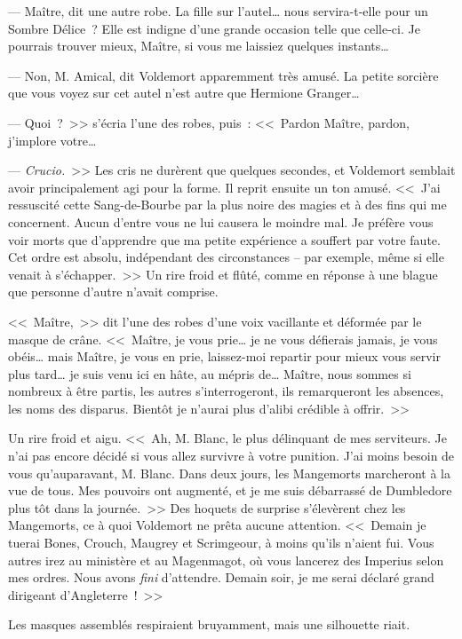 --- Maître, dit une autre robe. La fille sur l'autel… nous servira-t-elle pour un Sombre Délice~? Elle est indigne d'une grande occasion telle que celle-ci. Je pourrais trouver mieux, Maître, si vous me laissiez quelques instants…

--- Non, M. Amical, dit Voldemort apparemment très amusé. La petite sorcière que vous voyez sur cet autel n'est autre que Hermione Granger…

--- Quoi~?~>> s'écria l'une des robes, puis~: <<~Pardon Maître, pardon, j'implore votre…

--- \emph{Crucio.}~>> Les cris ne durèrent que quelques secondes, et Voldemort semblait avoir principalement agi pour la forme. Il reprit ensuite un ton amusé. <<~J'ai ressuscité cette Sang-de-Bourbe par la plus noire des magies et à des fins qui me concernent. Aucun d'entre vous ne lui causera le moindre mal. Je préfère vous voir morts que d'apprendre que ma petite expérience a souffert par votre faute. Cet ordre est absolu, indépendant des circonstances -- par exemple, même si elle venait à s'échapper.~>> Un rire froid et flûté, comme en réponse à une blague que personne d'autre n'avait comprise.

<<~Maître,~>> dit l'une des robes d'une voix vacillante et déformée par le masque de crâne. <<~Maître, je vous prie… je ne vous défierais jamais, je vous obéis… mais Maître, je vous en prie, laissez-moi repartir pour mieux vous servir plus tard… je suis venu ici en hâte, au mépris de… Maître, nous sommes si nombreux à être partis, les autres s'interrogeront, ils remarqueront les absences, les noms des disparus. Bientôt je n'aurai plus d'alibi crédible à offrir.~>>

Un rire froid et aigu. <<~Ah, M. Blanc, le plus délinquant de mes serviteurs. Je n'ai pas encore décidé si vous allez survivre à votre punition. J'ai moins besoin de vous qu'auparavant, M. Blanc. Dans deux jours, les Mangemorts marcheront à la vue de tous. Mes pouvoirs ont augmenté, et je me suis débarrassé de Dumbledore plus tôt dans la journée.~>> Des hoquets de surprise s'élevèrent chez les Mangemorts, ce à quoi Voldemort ne prêta aucune attention. <<~Demain je tuerai Bones, Crouch, Maugrey et Scrimgeour, à moins qu'ils n'aient fui. Vous autres irez au ministère et au Magenmagot, où vous lancerez des Imperius selon mes ordres. Nous avons \emph{fini} d'attendre. Demain soir, je me serai déclaré grand dirigeant d'Angleterre~!~>>

Les masques assemblés respiraient bruyamment, mais une silhouette riait.

